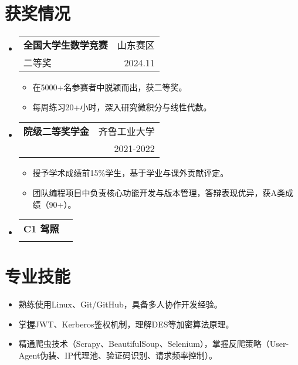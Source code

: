 \documentclass[a4paper,11pt]{ctexart}
\makeatletter
\newenvironment{resumeList}{\begin{itemize}[leftmargin=*,label={}]}{\end{itemize}}
\newcommand{\resumeItem}[1]{\item\small{#1}}
\newcommand{\resumeEntry}[4]{
  \item \begin{tabular*}{0.97\textwidth}[t]{l@{\extracolsep{\fill}}r}
    \textbf{#1} & #2 \\
    #3 & #4 \\
  \end{tabular*}
}
\makeatother
\begin{document}
\section{获奖情况}
\begin{resumeList}
    \resumeEntry{全国大学生数学竞赛}{山东赛区}{二等奖}{2024.11}
    \begin{resumeList}
        \resumeItem{在5000+名参赛者中脱颖而出，获二等奖。}
        \resumeItem{每周练习20+小时，深入研究微积分与线性代数。}
    \end{resumeList}
    \resumeEntry{院级二等奖学金}{齐鲁工业大学}{}{2021-2022}
    \begin{resumeList}
        \resumeItem{授予学术成绩前15\%学生，基于学业与课外贡献评定。}
        \resumeItem{团队编程项目中负责核心功能开发与版本管理，答辩表现优异，获A类成绩（90+）。}
    \end{resumeList}
    \resumeEntry{C1 驾照}{}{}{}
\end{resumeList}

\section{专业技能}
\begin{resumeList}
    \resumeItem{熟练使用Linux、Git/GitHub，具备多人协作开发经验。}
    \resumeItem{掌握JWT、Kerberos鉴权机制，理解DES等加密算法原理。}
    \resumeItem{精通爬虫技术（Scrapy、BeautifulSoup、Selenium），掌握反爬策略（User-Agent伪装、IP代理池、验证码识别、请求频率控制）。}
\end{resumeList}
\end{document}
